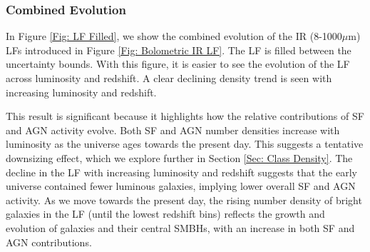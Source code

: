 \subsubsection{Combined Evolution}
In Figure \ref{Fig: LF Filled}, we show the combined evolution of the IR (8-1000$\mu$m) LFs introduced in Figure \ref{Fig: Bolometric IR LF}. The LF is filled between the uncertainty bounds. With this figure, it is easier to see the evolution of the LF across luminosity and redshift. A clear declining density trend is seen with increasing luminosity and redshift.

This result is significant because it highlights how the relative contributions of SF and AGN activity evolve. Both SF and AGN number densities increase with luminosity as the universe ages towards the present day. This suggests a tentative downsizing effect, which we explore further in Section \ref{Sec: Class Density}. The decline in the LF with increasing luminosity and redshift suggests that the early universe contained fewer luminous galaxies, implying lower overall SF and AGN activity. As we move towards the present day, the rising number density of bright galaxies in the LF (until the lowest redshift bins) reflects the growth and evolution of galaxies and their central SMBHs, with an increase in both SF and AGN contributions.





